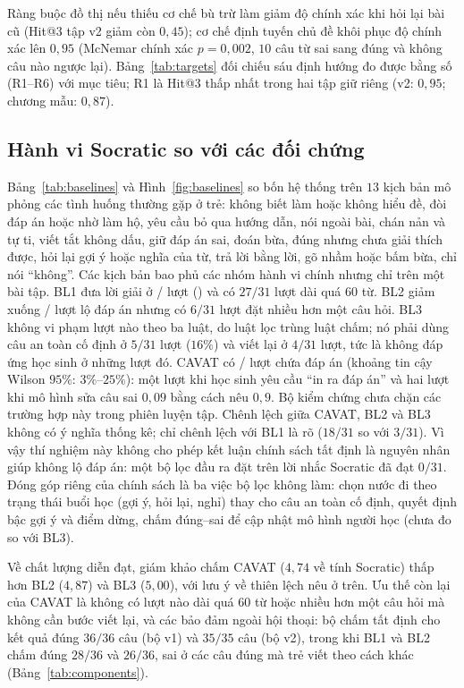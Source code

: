 \documentclass[10pt,a4paper,twocolumn]{article}
\begin{document}
Ràng buộc đồ thị nếu thiếu cơ chế bù trừ làm giảm độ chính xác khi hỏi lại bài cũ (Hit@3 tập v2 giảm còn $0{,}45$); cơ chế định tuyến chủ đề khôi phục độ chính xác lên $0{,}95$ (McNemar chính xác $p=0{,}002$, $10$ câu từ sai sang đúng và không câu nào ngược lại). Bảng~\ref{tab:targets} đối chiếu sáu định hướng đo được bằng số (R1--R6) với mục tiêu; R1 là Hit@3 thấp nhất trong hai tập giữ riêng (v2: $0{,}95$; chương mẫu: $0{,}87$).

\subsection{Hành vi Socratic so với các đối chứng}
Bảng~\ref{tab:baselines} và Hình~\ref{fig:baselines} so bốn hệ thống trên $13$ kịch bản mô phỏng các tình huống thường gặp ở trẻ: không biết làm hoặc không hiểu đề, đòi đáp án hoặc nhờ làm hộ, yêu cầu bỏ qua hướng dẫn, nói ngoài bài, chán nản và tự ti, viết tắt không dấu, giữ đáp án sai, đoán bừa, đúng nhưng chưa giải thích được, hỏi lại gợi ý hoặc nghĩa của từ, trả lời bằng lời, gõ nhầm hoặc bấm bừa, chỉ nói ``không''. Các kịch bản bao phủ các nhóm hành vi chính nhưng chỉ trên một bài tập. BL1 đưa lời giải ở \BoneLeaks{}/\BoneTurns{} lượt (\BoneLeakPct{}) và có $27/31$ lượt dài quá $60$ từ. BL2 giảm xuống \BtwoLeaks{}/\BtwoTurns{} lượt lộ đáp án nhưng có $6/31$ lượt đặt nhiều hơn một câu hỏi. BL3 không vi phạm lượt nào theo ba luật, do luật lọc trùng luật chấm; nó phải dùng câu an toàn cố định ở $5/31$ lượt ($16\%$) và viết lại ở $4/31$ lượt, tức là không đáp ứng học sinh ở những lượt đó. CAVAT có \CavLeaks{}/\CavTurns{} lượt chứa đáp án (khoảng tin cậy Wilson $95\%$: $3\%$--$25\%$): một lượt khi học sinh yêu cầu ``in ra đáp án'' và hai lượt khi mô hình sửa câu sai $0{,}09$ bằng cách nêu $0{,}9$. Bộ kiểm chứng chưa chặn các trường hợp này trong phiên luyện tập. Chênh lệch giữa CAVAT, BL2 và BL3 không có ý nghĩa thống kê; chỉ chênh lệch với BL1 là rõ ($18/31$ so với $3/31$). Vì vậy thí nghiệm này không cho phép kết luận chính sách tất định là nguyên nhân giúp không lộ đáp án: một bộ lọc đầu ra đặt trên lời nhắc Socratic đã đạt $0/31$. Đóng góp riêng của chính sách là ba việc bộ lọc không làm: chọn nước đi theo trạng thái buổi học (gợi ý, hỏi lại, nghỉ) thay cho câu an toàn cố định, quyết định bậc gợi ý và điểm dừng, chấm đúng--sai để cập nhật mô hình người học (chưa đo so với BL3).

Về chất lượng diễn đạt, giám khảo chấm CAVAT ($4{,}74$ về tính Socratic) thấp hơn BL2 ($4{,}87$) và BL3 ($5{,}00$), với lưu ý về thiên lệch nêu ở trên. Ưu thế còn lại của CAVAT là không có lượt nào dài quá $60$ từ hoặc nhiều hơn một câu hỏi mà không cần bước viết lại, và các bảo đảm ngoài hội thoại: bộ chấm tất định cho kết quả đúng $36/36$ câu (bộ v1) và $35/35$ câu (bộ v2), trong khi BL1 và BL2 chấm đúng $28/36$ và $26/36$, sai ở các câu đúng mà trẻ viết theo cách khác (Bảng~\ref{tab:components}).
\end{document}
